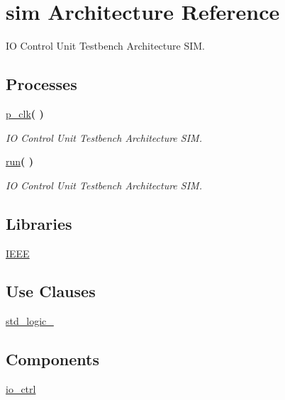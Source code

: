 \hypertarget{classtb__io__ctrl_1_1sim}{}\section{sim Architecture Reference}
\label{classtb__io__ctrl_1_1sim}


IO Control Unit Testbench Architecture S\+IM.  


\subsection*{Processes}
 \begin{DoxyCompactItemize}
\item 
\hyperlink{classtb__io__ctrl_1_1sim_af35c81fcf5e4601a4e5d669b422cf79a}{p\+\_\+clk}{\bfseries  (  )}
\begin{DoxyCompactList}\small\item\em IO Control Unit Testbench Architecture S\+IM. \end{DoxyCompactList}\item 
\hyperlink{classtb__io__ctrl_1_1sim_a0f40b896b2461e250ebafd4e27b8ff54}{run}{\bfseries  (  )}
\begin{DoxyCompactList}\small\item\em IO Control Unit Testbench Architecture S\+IM. \end{DoxyCompactList}\end{DoxyCompactItemize}
\subsection*{Libraries}
 \begin{DoxyCompactItemize}
\item 
\hyperlink{classtb__io__ctrl_1_1sim_ae4f03c286607f3181e16b9aa12d0c6d4}{I\+E\+EE} 
\end{DoxyCompactItemize}
\subsection*{Use Clauses}
 \begin{DoxyCompactItemize}
\item 
\hyperlink{classtb__io__ctrl_1_1sim_acd03516902501cd1c7296a98e22c6fcb}{std\+\_\+logic\+\_}   
\end{DoxyCompactItemize}
\subsection*{Components}
 \begin{DoxyCompactItemize}
\item 
\hyperlink{classtb__io__ctrl_1_1sim_a97c813578819a319bf5e8c6d53894fea}{io\+\_\+ctrl}  {\bfseries }  
\end{DoxyCompactItemize}
